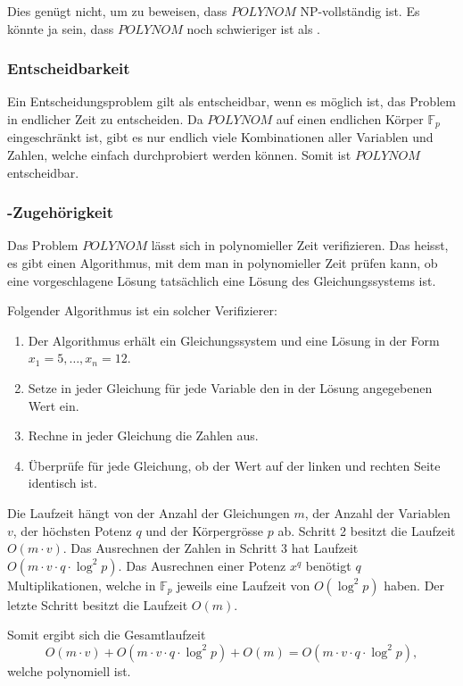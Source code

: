 Dies genügt nicht, um zu beweisen, dass $\textit{POLYNOM}$ NP-vollständig ist.
Es könnte ja sein, dass $\textit{POLYNOM}$ noch schwieriger ist als .

\subsubsection{Entscheidbarkeit}
%
Ein Entscheidungsproblem gilt als entscheidbar, wenn es möglich ist, das Problem in endlicher Zeit zu entscheiden.
Da $\textit{POLYNOM}$ auf einen endlichen Körper $\mathbb{F}_p$ eingeschränkt ist, gibt es nur endlich viele Kombinationen aller Variablen und Zahlen, welche einfach durchprobiert werden können.
Somit ist $\textit{POLYNOM}$ entscheidbar.
%

\subsubsection{-Zugehörigkeit}

Das Problem $\textit{POLYNOM}$ lässt sich in polynomieller Zeit verifizieren.
Das heisst, es gibt einen Algorithmus, mit dem man in polynomieller Zeit prüfen kann, ob eine vorgeschlagene Lösung tatsächlich eine Lösung des Gleichungssystems ist.

Folgender Algorithmus ist ein solcher Verifizierer:
%
\begin{enumerate}
  \item
  Der Algorithmus erhält ein Gleichungssystem und eine Lösung in der Form $x_1 = 5, \dots, x_n = 12$.
  \item
  Setze in jeder Gleichung für jede Variable den in der Lösung angegebenen Wert ein.
  \item
  Rechne in jeder Gleichung die Zahlen aus.
  \item
  Überprüfe für jede Gleichung, ob der Wert auf der linken und rechten Seite identisch ist.
\end{enumerate}
Die Laufzeit hängt von der Anzahl der Gleichungen $m$, der Anzahl der Variablen $v$, der höchsten Potenz $q$ und der Körpergrösse $p$ ab.
Schritt 2 besitzt die Laufzeit $O(m \cdot v)$.
Das Ausrechnen der Zahlen in Schritt 3 hat Laufzeit $O(m \cdot v \cdot q \cdot \log^2 p)$. Das Ausrechnen einer Potenz $x^q$ benötigt $q$ Multiplikationen, welche in $\mathbb{F}_p$ jeweils eine Laufzeit von $O(\log^2 p)$ haben.
%
Der letzte Schritt besitzt die Laufzeit $O(m)$.

Somit ergibt sich die Gesamtlaufzeit
\begin{equation}
O(m \cdot v) + O(m \cdot v \cdot q \cdot \log^2 p) + O(m) = O(m \cdot v \cdot q \cdot \log^2 p)
,
\end{equation}
welche polynomiell ist.

